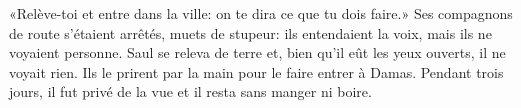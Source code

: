 «Relève-toi et entre dans la ville: on te dira ce que tu dois faire.»
Ses compagnons de route s’étaient arrêtés, muets de stupeur:
	ils entendaient la voix, mais ils ne voyaient personne.
Saul se releva de terre
	et, bien qu’il eût les yeux ouverts, il ne voyait rien.
	Ils le prirent par la main pour le faire entrer à Damas.
Pendant trois jours, il fut privé de la vue et il resta sans manger ni boire.
